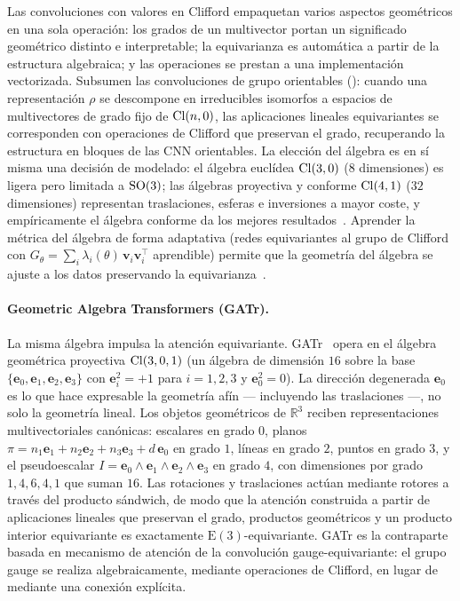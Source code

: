Las convoluciones con valores en Clifford empaquetan varios aspectos geom\'etricos
en una sola operaci\'on: los grados de un multivector portan un significado
geom\'etrico distinto e interpretable; la equivarianza es autom\'atica a partir de
la estructura algebraica; y las operaciones se prestan a una implementaci\'on
vectorizada. Subsumen las convoluciones de grupo orientables ():
cuando una representaci\'on $\rho$ se descompone en irreducibles isomorfos a
espacios de multivectores de grado fijo de $\operatorname{Cl}(n,0)$, las aplicaciones lineales
equivariantes se corresponden con operaciones de Clifford que preservan el grado,
recuperando la estructura en bloques de las CNN orientables. La elecci\'on del
\'algebra es en s\'i misma una decisi\'on de modelado: el \'algebra eucl\'idea
$\operatorname{Cl}(3,0)$ ($8$ dimensiones) es ligera pero limitada a $\operatorname{SO}(3)$; las \'algebras
proyectiva y conforme $\operatorname{Cl}(4,1)$ ($32$ dimensiones) representan traslaciones,
esferas e inversiones a mayor coste, y emp\'iricamente el \'algebra conforme da
los mejores resultados~\citep{dehaan2024euclidean}. Aprender la m\'etrica del
\'algebra de forma adaptativa (redes equivariantes al grupo de Clifford con
$G_\theta = \sum_i \lambda_i(\theta)\,\mathbf{v}_i\mathbf{v}_i^{\!\top}$ aprendible)
permite que la geometr\'ia del \'algebra se ajuste a los datos preservando la
equivarianza~\citep{ali2024metric}.

\paragraph{Geometric Algebra Transformers (GATr).}
La misma \'algebra impulsa la atenci\'on equivariante. GATr~\citep{brehmer2023geometric}
opera en el \'algebra geom\'etrica proyectiva $\operatorname{Cl}(3,0,1)$ (un \'algebra de
dimensi\'on $16$ sobre la base $\{\mathbf{e}_0, \mathbf{e}_1, \mathbf{e}_2,
\mathbf{e}_3\}$ con $\mathbf{e}_i^2 = +1$ para $i = 1,2,3$ y $\mathbf{e}_0^2 =
0$). La direcci\'on degenerada $\mathbf{e}_0$ es lo que hace expresable la
geometr\'ia af\'in --- incluyendo las traslaciones ---, no solo la geometr\'ia
lineal. Los objetos geom\'etricos de $\mathbb{R}^3$ reciben representaciones
multivectoriales can\'onicas: escalares en grado $0$, planos $\pi =
n_1\mathbf{e}_1 + n_2\mathbf{e}_2 + n_3\mathbf{e}_3 + d\,\mathbf{e}_0$ en grado
$1$, l\'ineas en grado $2$, puntos en grado $3$, y el pseudoescalar $I =
\mathbf{e}_0\wedge\mathbf{e}_1\wedge\mathbf{e}_2\wedge \mathbf{e}_3$ en grado $4$,
con dimensiones por grado $1, 4, 6, 4, 1$ que suman $16$. Las rotaciones y
traslaciones act\'uan mediante rotores a trav\'es del producto s\'andwich, de modo
que la atenci\'on construida a partir de aplicaciones lineales que preservan el
grado, productos geom\'etricos y un producto interior equivariante es exactamente
$\mathrm{E}(3)$-equivariante. GATr es la contraparte basada en mecanismo de
atenci\'on de la convoluci\'on gauge-equivariante: el grupo gauge se realiza
algebraicamente, mediante operaciones de Clifford, en lugar de mediante una
conexi\'on expl\'icita.

